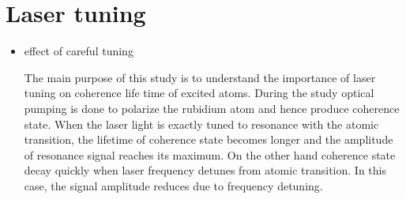 \section{Laser tuning} 
\begin{itemize}
\item effect of careful tuning

The main purpose of this study is to understand the importance of
laser tuning on coherence life time of excited atoms. During the study
optical pumping is done to polarize the rubidium atom and hence
produce coherence state. When the laser light is exactly tuned to
resonance with the atomic transition, the lifetime of coherence state
becomes longer and the amplitude of resonance signal reaches its
maximum. On the other hand coherence state decay quickly when laser
frequency detunes from atomic transition. In this case, the signal
amplitude reduces due to frequency detuning.


\end{itemize}

